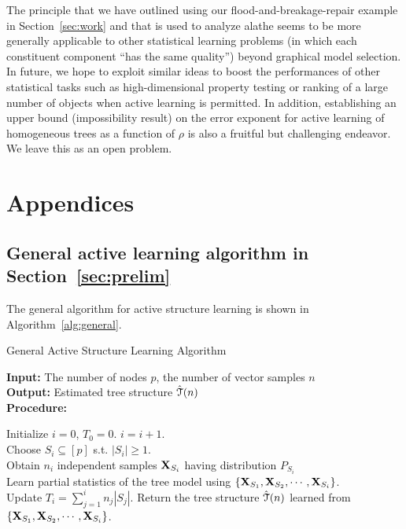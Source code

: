 The principle that we have outlined using our flood-and-breakage-repair example in Section~\ref{sec:work} and that is used to analyze \ac{alathe} seems to be  more generally applicable to other statistical learning problems (in which each constituent component ``has the same quality'') beyond graphical model selection. In future, we hope to exploit similar ideas to boost the performances of other statistical tasks such as high-dimensional property testing or ranking of a large number of objects when active learning is permitted. In addition, establishing an upper bound (impossibility result) on the error exponent for active learning of homogeneous trees as a function of $\rho$ is also a fruitful but challenging endeavor. We leave this as an open problem. 

\section{Appendices}\label{sec:app}

\subsection{General active learning algorithm in Section~\ref{sec:prelim}}\label{sec:appgenalgo}
The general algorithm for active structure learning is shown in Algorithm~\ref{alg:general}.
\begin{algorithm}[t]
\label{alg:general}
	\caption{General Active Structure Learning Algorithm}
	\textbf{Input:}  The number of nodes $p$, the number of vector samples $n$\\
	\textbf{Output:} Estimated tree structure $\hat{\mathcal{T}}(n)$ \\
	\textbf{Procedure:}
	\begin{algorithmic}[1]\label{algo:generalal}
		\STATE Initialize $i=0$, $T_{0}=0$.
			\STATE $i=i+1$.\\
			\STATE Choose $S_{i}\subseteq [p]$ s.t. $|S_{i}|\geq 1$.\\
			\STATE Obtain $n_{i}$ independent samples $\mathbf{X}_{S_{i}}$ having distribution $P_{S_{i}}$\\
			\STATE Learn partial statistics of the tree model using $\{\mathbf{X}_{S_{1}},\mathbf{X}_{S_{2}},\cdots,\mathbf{X}_{S_{i}}\}$.\\
			\STATE Update $T_{i}=\sum_{j=1}^{i}n_{j}|S_{j}|$.
		\ENDWHILE
		\STATE Return the tree structure $\hat{\mathcal{T}}(n)$ learned from $\{\mathbf{X}_{S_{1}},\mathbf{X}_{S_{2}},\cdots,\mathbf{X}_{S_{i}}\}$.
	\end{algorithmic}
\end{algorithm}

